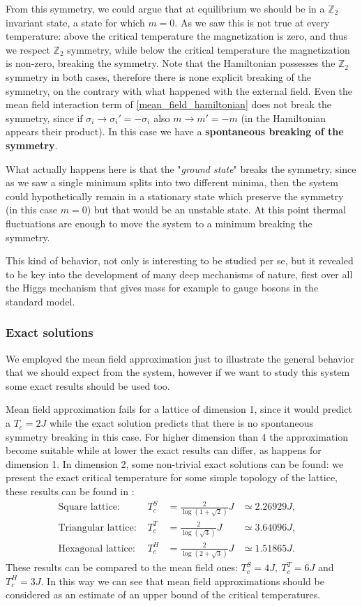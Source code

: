 From this symmetry, we could argue that at equilibrium we should be in a $\mathbb{Z}_2$ invariant state, a state for which $m=0$. As we saw this is not true at every temperature: above the critical temperature the magnetization is zero, and thus we respect $\mathbb{Z}_2$ symmetry, while below the critical temperature the magnetization is non-zero, breaking the symmetry. Note that the Hamiltonian possesses the $\mathbb{Z}_2$ symmetry in both cases, therefore there is none explicit breaking of the symmetry, on the contrary with what happened with the external field. Even the mean field interaction term of \eqref{mean_field_hamiltonian} does not break the symmetry, since if $\sigma_i\rightarrow\sigma_i'=-\sigma_i$ also $m\rightarrow m'=-m$ (in the Hamiltonian appears their product). In this case we have a \textbf{spontaneous breaking of the symmetry}.

What actually happens here is that the "\emph{ground state}" breaks the symmetry, since as we saw a single minimum splits into two different minima, then the system could hypothetically remain in a stationary state which preserve the symmetry (in this case $m=0$) but that would be an unstable state. At this point thermal fluctuations are enough to move the system to a minimum breaking the symmetry.

This kind of behavior, not only is interesting to be studied per se, but it revealed to be key into the development of many deep mechanisms of nature, first over all the Higgs mechanism that gives mass for example to gauge bosons in the standard model. 

\subsubsection{Exact solutions}
We employed the mean field approximation just to illustrate the general behavior that we should expect from the system, however if we want to study this system some exact results should be used too. 

Mean field approximation fails for a lattice of dimension 1, since it would predict a $T_c=2J$ while the exact solution predicts that there is no spontaneous symmetry breaking in this case. For higher dimension than 4 the approximation become suitable while at lower the exact results can differ, as happens for dimension 1. In dimension 2, some non-trivial exact solutions can be found: we present the exact critical temperature for some simple topology of the lattice, these results can be found in \cite{ExactIsing}:
\begin{align}
    &\text{Square lattice: } &T_c^S&=\frac{2}{\log(1+\sqrt{2})}J &\simeq 2.26929 J,&&\\
    &\text{Triangular lattice: } &T_c^T&=\frac{2}{\log(\sqrt{3})}J &\simeq 3.64096 J,&&\\
    &\text{Hexagonal lattice: } &T_c^H&=\frac{2}{\log(2+\sqrt{3})}J &\simeq 1.51865 J.&&
\end{align}
These results can be compared to the mean field ones: $T_c^{S}=4J,\ T_c^{T}=6J$ and $T_c^H=3J$. In this way we can see that mean field approximations should be considered as an estimate of an upper bound of the critical temperatures.
